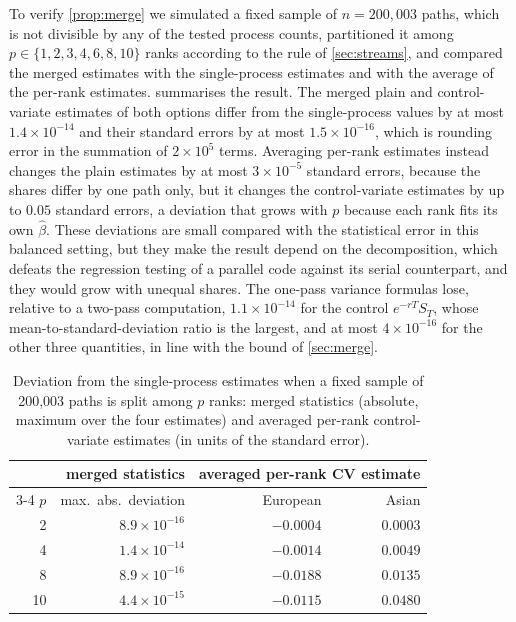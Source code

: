\documentclass[11pt,a4paper]{article}
\begin{document}
To verify \cref{prop:merge} we simulated a fixed sample of $n=200{,}003$ paths, which is not divisible by any of the tested process counts, partitioned it among $p\in\{1,2,3,4,6,8,10\}$ ranks according to the rule of \cref{sec:streams}, and compared the merged estimates with the single-process estimates and with the average of the per-rank estimates.
 summarises the result.
The merged plain and control-variate estimates of both options differ from the single-process values by at most $1.4\times10^{-14}$ and their standard errors by at most $1.5\times10^{-16}$, which is rounding error in the summation of $2\times10^5$ terms.
Averaging per-rank estimates instead changes the plain estimates by at most $3\times10^{-5}$ standard errors, because the shares differ by one path only, but it changes the control-variate estimates by up to $0.05$ standard errors, a deviation that grows with $p$ because each rank fits its own $\hat\beta$.
These deviations are small compared with the statistical error in this balanced setting, but they make the result depend on the decomposition, which defeats the regression testing of a parallel code against its serial counterpart, and they would grow with unequal shares.
The one-pass variance formulas lose, relative to a two-pass computation, $1.1\times10^{-14}$ for the control $e^{-rT}S_T$, whose mean-to-standard-deviation ratio is the largest, and at most $4\times10^{-16}$ for the other three quantities, in line with the bound of \cref{sec:merge}.

\begin{table}[ht]
\centering
\caption{Deviation from the single-process estimates when a fixed sample of 200{,}003 paths is split among $p$ ranks: merged statistics (absolute, maximum over the four estimates) and averaged per-rank control-variate estimates (in units of the standard error).}\label{tab:merge}
\small
\begin{tabular}{rrrr}
\toprule
& merged statistics & \multicolumn{2}{c}{averaged per-rank CV estimate} \\
\cmidrule(lr){3-4}
$p$ & max.\ abs.\ deviation & European & Asian \\
\midrule
2 & $8.9\times10^{-16}$ & $-0.0004$ & $0.0003$ \\
4 & $1.4\times10^{-14}$ & $-0.0014$ & $0.0049$ \\
8 & $8.9\times10^{-16}$ & $-0.0188$ & $0.0135$ \\
10 & $4.4\times10^{-15}$ & $-0.0115$ & $0.0480$ \\
\bottomrule
\end{tabular}
\end{table}
\end{document}
